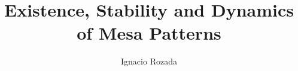 \documentclass[fogscopy,onehalfspacing,11pt]{ubcdiss}
\title{Existence, Stability and Dynamics of Mesa Patterns}
\author{Ignacio Rozada}
\begin{document}
\maketitle


\cleardoublepage


\cleardoublepage

\tableofcontents
\cleardoublepage	%

\listoftables
\cleardoublepage	%

\listoffigures
\cleardoublepage	%

\tableofcontents
\cleardoublepage	%


\textspacing		%

% 

\mainmatter

\acresetall	%








\begin{singlespace}
\raggedright


\end{singlespace}

\appendix
\backmatter


% 
% 
\end{document}
